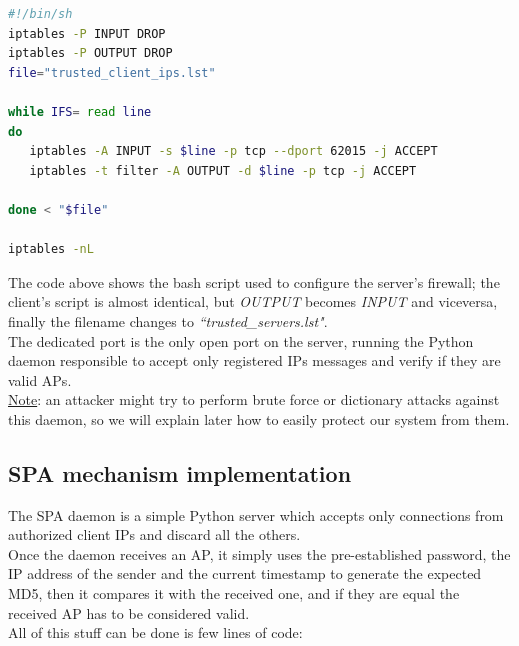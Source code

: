 \documentclass[12pt]{report}
\begin{document}
{{\clearpage
\begin{center}
  \lstset{%
    caption=Server's firewall configuration script,
    basicstyle=\ttfamily\small\bfseries,
    frame=tb
  }
  
\begin{lstlisting}[language=bash]
#!/bin/sh
iptables -P INPUT DROP
iptables -P OUTPUT DROP
file="trusted_client_ips.lst"

while IFS= read line
do
   iptables -A INPUT -s $line -p tcp --dport 62015 -j ACCEPT
   iptables -t filter -A OUTPUT -d $line -p tcp -j ACCEPT

done < "$file"

iptables -nL
\end{lstlisting}
\end{center}

The code above shows the bash script used to configure the server's firewall; the client's script is almost identical, but \emph{OUTPUT} becomes \emph{INPUT} and viceversa, finally the filename changes to \emph{``trusted\_servers.lst"}.\\


The dedicated port is the only open port on the server, running the Python daemon responsible to accept only registered IPs messages and verify if they are valid APs.\\
\underline{Note}:  an attacker might try to perform brute force or dictionary attacks against this daemon, so we will explain later how to easily protect our system from them.\\

\subsection{SPA mechanism implementation}
\bigskip

The SPA daemon is a simple Python server which accepts only connections from authorized client IPs and discard all the others.\\

Once the daemon receives an AP, it simply uses the pre-established password, the IP address of the sender and the current timestamp to generate the expected MD5, then it compares it with the received one, and if they are equal the received AP has to be considered valid.\\
All of this stuff can be done is few lines of code:\\

\begin{python}


\end{python}}}
\end{document}
